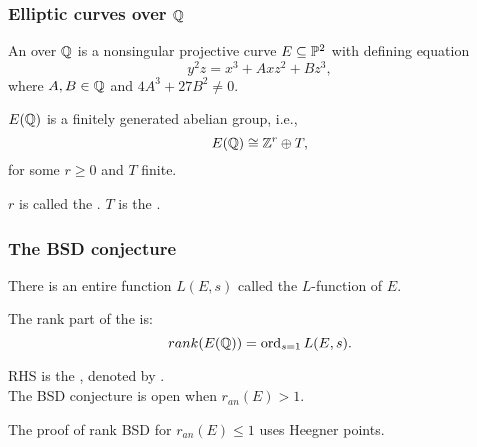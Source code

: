 \documentclass[handout]{beamer}
\begin{document}
\begin{frame}
\frametitle{Elliptic curves over $\mathbb{Q}$}
\begin{Def}
An  over $\mathbb{Q}$ is a nonsingular projective curve $E \subseteq \mathbb{P}^2$ with defining equation 
\begin{equation*}
y^2z = x^3 + Axz^2+Bz^3, 
\end{equation*}
where $A,B \in \mathbb{Q}$ and  $4A^3+27B^2 \neq 0$.
\end{Def}



\pause

\begin{theorem}
$E(\mathbb{Q})$ is a finitely generated abelian group, i.e., $$E(\mathbb{Q}) \cong \mathbb{Z}^r \oplus T,$$
for some $r \geq 0$ and $T$ finite. 
\end{theorem}
$r$ is called the . $T$ is the . 

\end{frame}



\begin{frame}
\frametitle{The BSD conjecture} 


There is an entire function $L(E,s)$ called the $L$-function of $E$.  \\

\medskip

The rank part of the   is:
\begin{equation*}
	rank(E(\mathbb{Q})) = \operatorname{ord}_{s=1}L(E,s).
\end{equation*}

\pause

RHS is the , denoted by . \\
The BSD conjecture is open when $r_{an}(E) > 1$. \\

\medskip
\pause

The proof of rank BSD for $r_{an}(E) \leq 1$ uses Heegner points. 


\end{frame}
\end{document}
